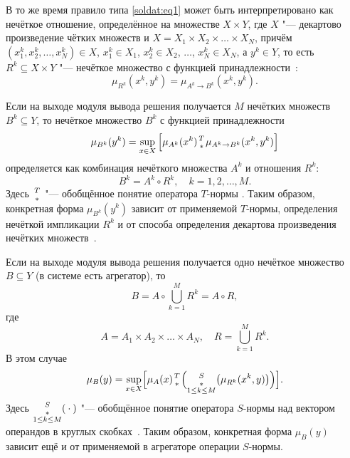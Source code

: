 В то же время правило типа \eqref{soldat:eq1} может быть интерпретировано как нечёткое
отношение, определённое на множестве $X\times Y$, где $X$ "--- декартово
произведение чётких множеств и $X=X_1 \times X_2 \times \ldots \times X_N$,
причём $\left(x_1^k,x_2^k ,\ldots,x_N^k \right)\in X$, $x_1^k \in X_1$, $x_2^k \in X_2
$, $\ldots$, $x_N^k \in X_N $, а $y^k\in Y$, то есть $R^k\subseteq X\times Y$ "--- 
нечёткое множество с функцией принадлежности~\cite{soldat:bib3}:
\begin{equation}
\label{soldat:eq3}
\mu_{R^k}(x^k,y^k)=\mu_{A^k\to B^k} (x^k,y^k).
\end{equation}

Если на выходе модуля вывода решения получается $M$ нечётких множеств $B^k\subseteq Y$, то нечёткое множество $B^k$ с функцией принадлежности
\begin{equation}
\label{soldat:eq4}
\mu_{B^k} (y^k)=\sup \limits_{x\in X} 
\left[\mu_{A^k} (x^k) \genfrac{}{}{0pt}{1}{T}{\ast}\mu _{A^k\to B^k} (x^k,y^k)\right]
\end{equation}
определяется как комбинация нечёткого множества $A^k$ и отношения $R^k$:
\begin{equation}
\label{soldat:eq5}
B^k=A^k\circ R^k,\quad k=1, 2, \dots, M.
\end{equation}
Здесь $\genfrac{}{}{0pt}{1}{T}{\ast}$ "--- обобщённое понятие оператора $T$-нормы \cite{soldat:bib3}.
Таким образом, конкретная форма $\mu _{B^k} (y^k)$ зависит от
применяемой $T$-нормы, определения нечёткой импликации $R^k$ и от способа
определения декартова произведения нечётких множеств~\cite{soldat:bib3}.

Если на выходе модуля вывода решения получается одно нечёткое множество
$B\subseteq Y$ (в системе есть агрегатор), то 
$$B=A\circ
\bigcup \limits_{k=1}^M R^k =A\circ R,$$ где 
$$A=A_1 \times A_2 \times \ldots \times A_N , \quad R=\bigcup\limits_{k=1}^M {R^k} .$$ 
В этом случае
\begin{equation}
\label{soldat:eq6}
\mu _B ( y )=\sup \limits_{x\in X} \Bigl[ \mu _A
(x) \genfrac{}{}{0pt}{1}{T}{\ast}
\Bigl(
\mathop{\genfrac{}{}{0pt}{1}{S}{\ast}}
\limits_{1\le k\le M}
\bigl(\mu _{R^k}
(x^k,y)\bigr) \Bigr)\Bigr].
\end{equation}
Здесь $\mathop{\genfrac{}{}{0pt}{1}{S}{\ast}}
\limits_{1\le k\le M} ({}\cdot{})$ "--- обобщённое понятие оператора $S$-нормы над вектором операндов в круглых скобках~\cite{soldat:bib3}.
Таким образом, конкретная форма $\mu _B ( y )$ зависит ещё и от применяемой в агрегаторе операции $S$-нормы.

